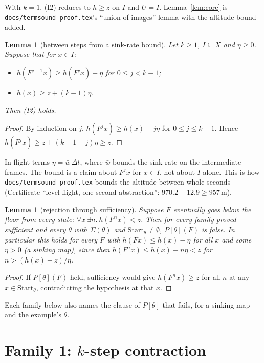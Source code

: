 \documentclass[11pt]{article}
\newtheorem{lemma}[theorem]{Lemma}
\theoremstyle{definition}
\newcommand{\Start}{\ensuremath{\mathrm{Start}}}
\begin{document}
With $k = 1$, (I2) reduces to $h \ge z$ on $I$ and $U = I$. Lemma~\ref{lem:core} is \texttt{docs/termsound-proof.tex}'s ``union of images'' lemma with the altitude bound added.

\begin{lemma}[between steps from a sink-rate bound]\label{lem:sink}
Let $k \ge 1$, $I \subseteq X$ and $\eta \ge 0$. Suppose that for $x \in I$:
\begin{itemize}
\item $h(F^{j+1} x) \ge h(F^j x) - \eta$ for $0 \le j < k - 1$;
\item $h(x) \ge z + (k-1)\eta$.
\end{itemize}
Then (I2) holds.
\end{lemma}
\begin{proof}
By induction on $j$, $h(F^j x) \ge h(x) - j\eta$ for $0 \le j \le k - 1$. Hence $h(F^j x) \ge z + (k - 1 - j)\eta \ge z$.
\end{proof}

In flight terms $\eta = \bar w\,\Delta t$, where $\bar w$ bounds the sink rate on the intermediate frames. The bound is a claim about $F^j x$ for $x \in I$, not about $I$ alone. This is how \texttt{docs/termsound-proof.tex} bounds the altitude between whole seconds (Certificate ``level flight, one-second abstraction'': $970.2 - 12.9 \ge 957$\,m).

\begin{lemma}[rejection through sufficiency]\label{lem:reject}
Suppose $F$ eventually goes below the floor from every state: $\forall x\ \exists n.\ h(F^n x) < z$. Then for every family proved sufficient and every $\theta$ with $\Sigma(\theta)$ and $\Start_\theta \ne \emptyset$, $P[\theta](F)$ is false. In particular this holds for every $F$ with $h(F x) \le h(x) - \eta$ for all $x$ and some $\eta > 0$ (a \emph{sinking map}), since then $h(F^n x) \le h(x) - n\eta < z$ for $n > (h(x) - z)/\eta$.
\end{lemma}
\begin{proof}
If $P[\theta](F)$ held, sufficiency would give $h(F^n x) \ge z$ for all $n$ at any $x \in \Start_\theta$, contradicting the hypothesis at that $x$.
\end{proof}

Each family below also names the clause of $P[\theta]$ that fails, for a sinking map and the example's $\theta$.

\section{Family 1: $k$-step contraction}\label{sec:k}
\end{document}
